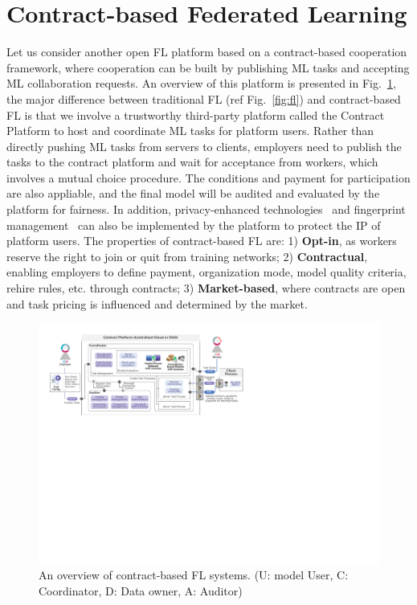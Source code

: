 \section{Contract-based Federated Learning}
\label{sec:contract}
Let us consider another open FL platform based on a contract-based cooperation framework, where cooperation can be built by publishing ML tasks and accepting ML collaboration requests.
An overview of this platform is presented in Fig.~\ref{fig:contract}, the major difference between traditional FL (ref Fig.~\ref{fig:fl}) and contract-based FL is that we involve a trustworthy third-party platform called the Contract Platform to host and coordinate ML tasks for platform users.
Rather than directly pushing ML tasks from servers to clients, employers need to publish the tasks to the contract platform and wait for acceptance from workers, which involves a mutual choice procedure. 
The conditions and payment for participation are also appliable, and the final model will be audited and evaluated by the platform for fairness.
In addition, privacy-enhanced technologies~\cite{hesamifard2018privacy} and fingerprint management~\cite{chen2022copy} can also be implemented by the platform to protect the IP of platform users.
The properties of contract-based FL are: 1) \textbf{Opt-in}, as workers reserve the right to join or quit from training networks; 2) \textbf{Contractual}, enabling employers to define payment, organization mode, model quality criteria, rehire rules, etc. through contracts; 3) \textbf{Market-based}, where contracts are open and task pricing is influenced and determined by the market.

\begin{figure}[t]
    \centering
    \includegraphics[width=\linewidth]{fig/contract_frame.pdf}
    \caption{An overview of contract-based FL systems. (U: model User, C: Coordinator, D: Data owner, A: Auditor)}
    \Description{}
    \label{fig:contract}
\end{figure}

